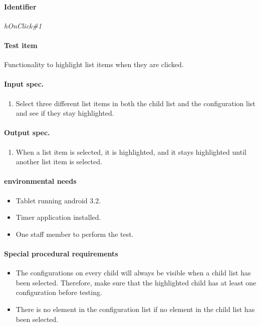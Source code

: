 \clearpage
\paragraph{Identifier}
	\textit{hOnClick\#1}
\paragraph{Test item}
	Functionality to highlight list items when they are clicked.
\paragraph{Input spec.}
	\begin{enumerate}
		\item Select three different list items in both the child list and the configuration list and see if they stay highlighted.
	\end{enumerate}
\paragraph{Output spec.}
	\begin{enumerate}
		\item When a list item is selected, it is highlighted, and it stays highlighted until another list item is selected.
	\end{enumerate}
\paragraph{environmental needs}
	\begin{itemize}
		\item Tablet running android 3.2.
		\item Timer application installed.
		\item One staff member to perform the test.
	\end{itemize}
\paragraph{Special procedural requirements}
	\begin{itemize}
		\item The configurations on every child will always be visible when a child list has been selected. Therefore, make sure that the highlighted child has at least one configuration before testing.
		\item There is no element in the configuration list if no element in the child list has been selected.
	\end{itemize}

